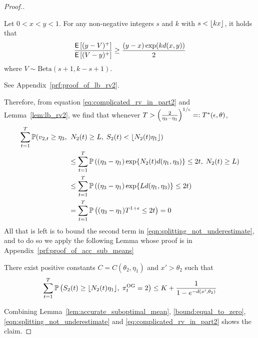 \begin{proof}[Proof.]
	\begin{lemma} \label{lem:lb_rv2}
		Let $0 < x < y < 1$. For any non-negative integers $s$ and $k$ with $s < \lfloor kx\rfloor$, it holds that
		\begin{equation*}
		\frac{\mathsf{E} \left[ (y-V)^+  \right]}{  \mathsf{E} \left[ (V - y)^+  \right] } \ge \frac{(y-x) \exp(k d(x,y))}{2}
		\end{equation*}
		where $V \sim \text{Beta}(s+1,k-s+1)$.
	\end{lemma}
	\begin{myproof}[Proof.]
		See Appendix~\ref{prf:proof_of_lb_rv2}.
	\end{myproof}
	Therefore, from equation \eqref{eq:complicated_rv_in_part2} and Lemma~\ref{lem:lb_rv2}, we find that whenever $T > \left(\frac{2}{\eta_3-\eta_1}\right)^{1/\epsilon} =: T^*(\epsilon, \theta)$,
	\begin{align}
	\sum_{t=1}^T \mathbb{P}(v_{2,t} \ge \eta_3 ,\; & \; N_2(t) \ge L,\; S_2(t) < \lfloor N_2(t) \eta_1\rfloor) \nonumber \\
	& \le  \sum_{t=1}^T\mathbb{P} \left(   (\eta_3-\eta_1) \exp\{N_2(t) d(\eta_1,\eta_3) \} \le 2t,\; N_2(t) \ge L \right) \nonumber \\
	& \le  \sum_{t=1}^T\mathbb{P} \left(   (\eta_3-\eta_1) \exp\{L d(\eta_1,\eta_3) \} \le 2t \right) \nonumber \\
	& =   \sum_{t=1}^T\mathbb{P} \left(   (\eta_3-\eta_1) T^{1+\epsilon} \le 2t \right) = 0 \label{bound:equal_to_zero}
	\end{align}
	All that is left is to bound the second term in \eqref{eqn:splitting_not_underestimate}, and to do so we apply the following Lemma whose proof is in Appendix~\ref{prf:proof_of_acc_sub_means}
	\begin{lemma} \label{lem:accurate_suboptimal_mean}
		There exist positive constants $C = C(\theta_2,\eta_1)$ and $x' > \theta_2$ such that
		\begin{equation*}
		\sum_{t=1}^T \mathbb{P} \left( S_2(t) \ge \lfloor N_2(t) \eta_1\rfloor, \; \pi^{\rm OG}_t = 2 \right) \le  K + \frac{1}{1 - e^{-d(x',\theta_2)}} 
		\end{equation*}
	\end{lemma}
	Combining Lemma~\ref{lem:accurate_suboptimal_mean}, \eqref{bound:equal_to_zero}, \eqref{eqn:splitting_not_underestimate} and \eqref{eq:complicated_rv_in_part2} shows the claim.
\end{proof}

